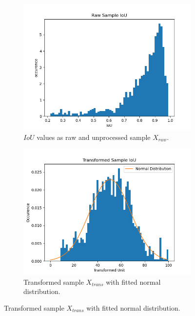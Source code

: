 \begin{figure} [h]
	\centering
	\begin{subfigure}[t]{0.3\textwidth}
		\centering
		\includegraphics[width=\textwidth]{figures/chap51_iou_raw.png}
		\caption{
			$IoU$ values as raw and unprocessed sample $X_{raw}$.
		}\label{fig:ch5:sec1:data_raw}
	\end{subfigure}
	\hfill
	\begin{subfigure}[t]{0.3\textwidth}
		\centering
		\includegraphics[width=\textwidth]{figures/chap51_iou_trans.png}
		\caption{
			Transformed sample $X_{trans}$ with fitted normal distribution.
		} \label{fig:ch5:sec1:data_transformed}
	\end{subfigure}
	\hfill

\end{figure}
